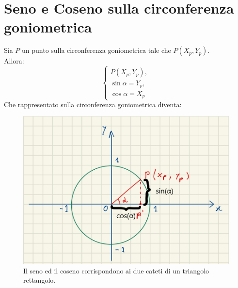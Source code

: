 \documentclass[12pt]{article}
\begin{document}
\section{Seno e Coseno sulla circonferenza goniometrica}
Sia $P$ un punto sulla circonferenza goniometrica tale che $P(X_p,Y_p)$.\\
Allora:
\begin{equation}
    \begin{cases}
        P(X_p,Y_p),\\
        \sin{\alpha} = Y_p,\\
        \cos{\alpha} = X_p
        \label{eq:sin_cos_definizione}
    \end{cases}
\end{equation}
Che rappresentato sulla circonferenza goniometrica diventa:
\begin{figure}[!htb]
    \centering
    \includegraphics[width=1\textwidth, height=.7\textheight,keepaspectratio]{lezione_6/sin_cos_definizione.png}
    \begin{center}
        \caption{\label{fig:sin_cos_definizione}Il seno ed il coseno corrispondono ai due cateti di un triangolo rettangolo.}
    \end{center}
\end{figure}
\pagebreak
\end{document}
